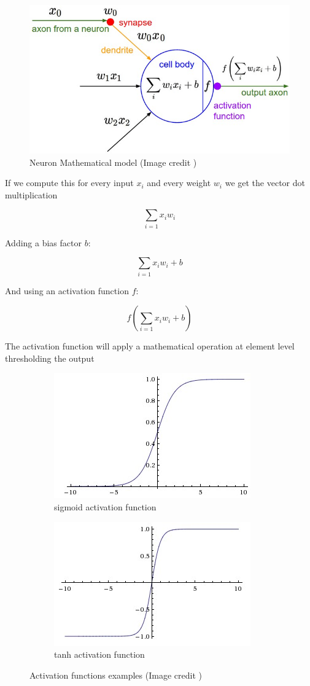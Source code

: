 \begin{figure}[th]
    \centering
    \includegraphics[width=1.0\textwidth]{Figures/Neuron}
    \decoRule
    \caption[Neuron Mathematical model]{Neuron Mathematical model (Image credit \cite{cs231n})}
    \label{fig:neuron}
\end{figure}

If we compute this for every input $x_i$ and every weight $w_i$ we get the vector dot multiplication

$$ \sum_{i=1} x_i w_i  $$ 

Adding a bias factor $b$:

$$ \sum_{i=1} x_i w_i  + b$$ 

And using an activation function $f$:

$$ f(\sum_{i=1} x_i w_i + b)  $$ 

The activation function will apply a mathematical operation at element level thresholding the output

\begin{figure}
    \centering
    \begin{subfigure}{.5\textwidth}
        \centering
        \includegraphics[width=.4\linewidth]{Figures/sigmoid}
        \caption{sigmoid activation function}
        \label{fig:sub1}
    \end{subfigure}%
    \begin{subfigure}{.5\textwidth}
        \centering
        \includegraphics[width=.4\linewidth]{Figures/tanh}
        \caption{tanh activation function}
        \label{fig:sub2}
    \end{subfigure}
    \caption[Activation functions]{Activation functions examples (Image credit \cite{cs231n})}
    \label{fig:activations}
\end{figure}



